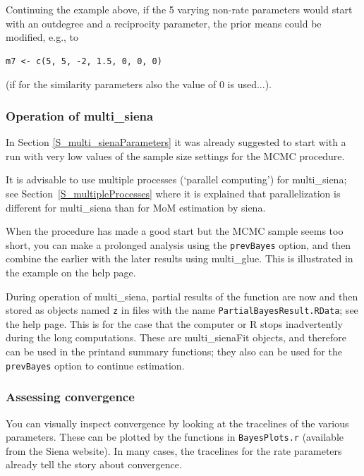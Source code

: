 \documentclass[a4paper,fleqn,11pt]{article}
\newcommand{\+}{\, + \,}
\newcommand{\sfn}[1]{\textsf{#1}}
\newcommand{\R}{{\sf R }}
\begin{document}
Continuing the example above, if the 5 varying non-rate parameters would
start with an outdegree and a reciprocity parameter, the prior means
could be modified, e.g., to
\begin{verbatim}
m7 <- c(5, 5, -2, 1.5, 0, 0, 0)
\end{verbatim}
(if for the similarity parameters also the value of 0 is used...).


\subsubsection{Operation of \textsf{multi\_siena}}

In Section \ref{S_multi_sienaParameters} it was already suggested to
start with a run with very low values of the sample size settings for the
MCMC procedure.

It is advisable to use multiple processes (`parallel computing') for
\textsf{multi\_siena}; see Section~\ref{S_multipleProcesses} where it is explained
that parallelization is different for \textsf{multi\_siena} than for MoM
estimation by \textsf{siena}.

When the procedure has made a good start but the MCMC sample seems too
short, you can make a prolonged analysis using the \texttt{prevBayes} option,
and then combine the earlier with the later results using \sfn{multi\_glue}.
This is illustrated in the example on the help page.

During operation of \sfn{multi\_siena}, partial results of the function
are now and then stored
as objects named \texttt{z} in files with the name
\texttt{PartialBayesResult.RData}; see the help page.
This is for the case that the computer or \R stops inadvertently
during the long computations.
These are \sfn{multi\_sienaFit} objects, and therefore can be used in the
\textsf{print}and \textsf{summary} functions; they also can be used for
the \texttt{prevBayes} option to continue estimation.

\subsubsection{Assessing convergence}

You can visually inspect convergence by looking at the tracelines of the
various parameters. These can be plotted by the functions in \texttt{BayesPlots.r}
(available from the Siena website). In many cases, the tracelines for
the rate parameters already tell the story about convergence.
\end{document}
